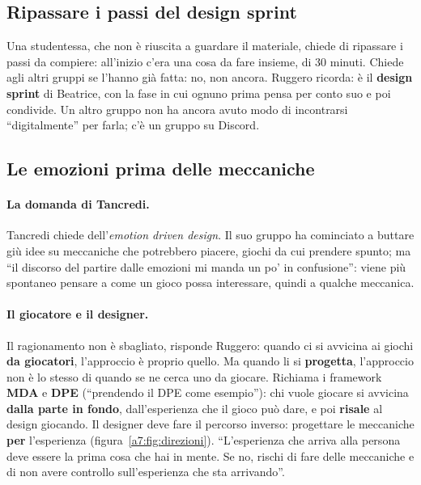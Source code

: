 \subsection{Ripassare i passi del design sprint}
\label{a7:sec:tut-passi}

Una studentessa, che non è riuscita a guardare il materiale, chiede di ripassare i
passi da compiere: all'inizio c'era una cosa da fare insieme, di 30 minuti. Chiede agli
altri gruppi se l'hanno già fatta: no, non ancora. Ruggero ricorda: è il \textbf{design
sprint} di Beatrice, con la fase in cui ognuno prima pensa per conto suo e poi
condivide. Un altro gruppo non ha ancora avuto modo di incontrarsi ``digitalmente''
per farla; c'è un gruppo su Discord.

\subsection{Le emozioni prima delle meccaniche}
\label{a7:sec:tut-emozioni}

\paragraph{La domanda di Tancredi.} Tancredi chiede dell'\emph{emotion driven design}.
Il suo gruppo ha cominciato a buttare giù idee su meccaniche che potrebbero piacere,
giochi da cui prendere spunto; ma ``il discorso del partire dalle emozioni mi manda un
po' in confusione'': viene più spontaneo pensare a come un gioco possa interessare,
quindi a qualche meccanica.

\paragraph{Il giocatore e il designer.} Il ragionamento non è sbagliato, risponde
Ruggero: quando ci si avvicina ai giochi \textbf{da giocatori}, l'approccio è
proprio quello. Ma quando li si \textbf{progetta}, l'approccio non è lo stesso di
quando se ne cerca uno da giocare. Richiama i framework \textbf{MDA} e \textbf{DPE}
(``prendendo il DPE come esempio''): chi vuole giocare si avvicina \textbf{dalla
parte in fondo}, dall'esperienza che il gioco può dare, e poi \textbf{risale} al
design giocando. Il designer deve fare il percorso inverso: progettare le meccaniche
\textbf{per} l'esperienza (figura~\ref{a7:fig:direzioni}). ``L'esperienza che arriva
alla persona deve essere la prima cosa che hai in mente. Se no, rischi di fare delle
meccaniche e di non avere controllo sull'esperienza che sta arrivando''.

